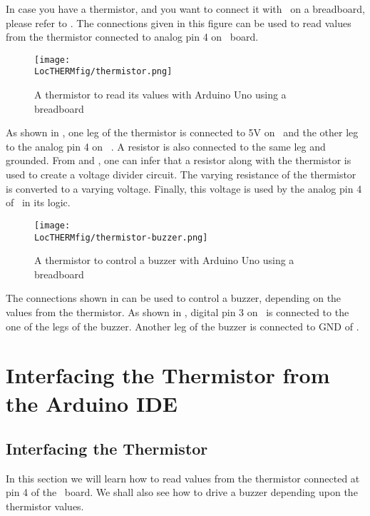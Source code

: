 In case you have a thermistor, and you want to connect it with \arduino\ on a breadboard, 
please refer to . The connections given in this figure 
can be used to read values from the thermistor connected to analog pin 4 on \arduino\
board. 
\begin{figure}
  \centering
  \texttt{[image: \\LocTHERMfig/thermistor.png]}
  \caption{A thermistor to read its values with Arduino Uno using a breadboard}
  \label{fig:ard-therm-bread}
\end{figure}
As shown in , one leg of the thermistor is connected 
to 5V on \arduino\ and the other leg to the analog pin 4 on  \arduino. A resistor is also 
connected to the same leg and grounded. From \figref{fig:therm-conn} and , one can infer that a resistor 
along with the thermistor is used to create a voltage divider circuit. The varying 
resistance of the thermistor is converted to a varying voltage. Finally, this voltage is used 
by the analog pin 4 of \arduino\ in its logic. 

\begin{figure}
  \centering
  \texttt{[image: \\LocTHERMfig/thermistor-buzzer.png]}
  \caption{A thermistor to control a buzzer with Arduino Uno using a breadboard}
  \label{fig:ard-therm-buzzer}
\end{figure}
The connections shown in  can be used to control a buzzer, 
depending on the values from the thermistor. As shown in \figref{fig:ard-therm-buzzer}, 
digital pin 3 on \arduino\ is connected to the one of the legs of the buzzer. Another 
leg of the buzzer is connected to GND of \arduino.    


\section{Interfacing the Thermistor from the Arduino IDE}
\subsection{Interfacing the Thermistor}
In this section we will learn how to read values from the thermistor
connected at pin 4 of the \arduino\ board. We shall also see how to
drive a buzzer depending upon the thermistor values.

